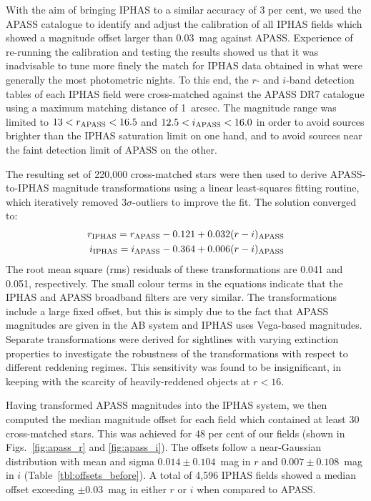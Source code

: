 \documentclass[a4paper,useAMS,usenatbib]{mn2e}
\begin{document}
With the aim of bringing IPHAS to a similar accuracy of 3 per cent,
we used the APASS catalogue to identify and adjust the calibration of all IPHAS fields 
which showed a magnitude offset larger than 0.03~mag against APASS.  Experience of re-running
the calibration and testing the results showed us that it was inadvisable to tune more
finely the match for IPHAS data obtained in what were generally the most photometric
nights.  To this end,
the $r$- and $i$-band detection tables of each IPHAS field
were cross-matched against the APASS DR7 catalogue 
using a maximum matching distance of 1~arcsec.
The magnitude range was limited to
$13<r_{\rm APASS}<16.5$ and $12.5<i_{\rm APASS}<16.0$
in order to avoid sources 
brighter than the IPHAS saturation limit on one hand, 
and to avoid sources near the faint detection limit of APASS 
on the other.

The resulting set of 220,000 cross-matched stars were then used 
to derive APASS-to-IPHAS magnitude transformations
using a linear least-squares fitting routine, 
which iteratively removed $3\sigma$-outliers to improve the fit.
The solution converged to:
\begin{align} 
r_{\rm IPHAS} = r_{\rm APASS} - 0.121 + 0.032(r-i)_{\rm APASS} \label{eqn:apass_r} \\
i_{\rm IPHAS} = i_{\rm APASS} - 0.364 + 0.006(r-i)_{\rm APASS} \label{eqn:apass_i}
\end{align}
The root mean square (rms) residuals of these transformations 
are 0.041 and 0.051, respectively.
The small colour terms in the equations
indicate that the IPHAS and APASS broadband filters 
are very similar.
The transformations include a large fixed offset,
but this is simply due to the fact that 
APASS magnitudes are given in the AB system
and IPHAS uses Vega-based magnitudes.
Separate transformations were derived for sightlines 
with varying extinction properties to investigate the robustness
of the transformations with respect to different reddening regimes.
This sensitivity was found to be insignificant, in keeping with
the scarcity of heavily-reddened objects at $r<16$.

Having transformed APASS magnitudes into the IPHAS system,
we then computed the median magnitude offset 
for each field which contained at least 30 cross-matched stars.
This was achieved for 48 per cent of our fields (shown in Figs.~\ref{fig:apass_r} and \ref{fig:apass_i}).
The offsets follow a near-Gaussian distribution
with mean and sigma $0.014\pm0.104$~mag in $r$
and $0.007\pm0.108$~mag in $i$ (Table~\ref{tbl:offsets_before}).
A total of 4,596 IPHAS fields showed a median offset
exceeding $\pm$0.03~mag in either $r$ or $i$
when compared to APASS.
\end{document}
